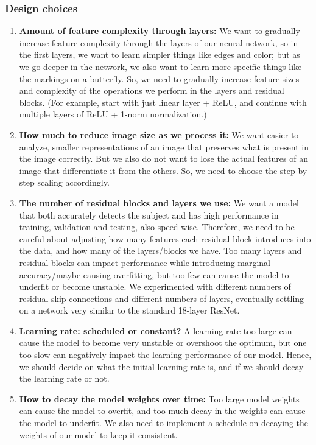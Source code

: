 \documentclass[10pt]{article} %
\begin{document}
\subsubsection{Design choices}
\begin{enumerate}
  \item \textbf{Amount of feature complexity through layers:} We want to gradually increase feature complexity through the layers of our neural network, so in the first layers, we want to learn simpler things like edges and color; but as we go deeper in the network, we also want to learn more specific things like the markings on a butterfly. So, we need to gradually increase feature sizes and complexity of the operations we perform in the layers and residual blocks. (For example, start with just linear layer + ReLU, and continue with multiple layers of ReLU + 1-norm normalization.)
  \item \textbf{How much to reduce image size as we process it:} We want easier to analyze, smaller representations of an image that preserves what is present in the image correctly. But we also do not want to lose the actual features of an image that differentiate it from the others. So, we need to choose the step by step scaling accordingly.
  \item \textbf{The number of residual blocks and layers we use:} We want a model that both accurately detects the subject and has high performance in training, validation and testing, also speed-wise. Therefore, we need to be careful about adjusting how many features each residual block introduces into the data, and how many of the layers/blocks we have. Too many layers and residual blocks can impact performance while introducing marginal accuracy/maybe causing overfitting, but too few can cause the model to underfit or become unstable. We experimented with different numbers of residual skip connections and different numbers of layers, eventually settling on a network very similar to the standard 18-layer ResNet.
  \item \textbf{Learning rate: scheduled or constant?} A learning rate too large can cause the model to become very unstable or overshoot the optimum, but one too slow can negatively impact the learning performance of our model. Hence, we should decide on what the initial learning rate is, and if we should decay the learning rate or not.
  \item \textbf{How to decay the model weights over time:} Too large model weights can cause the model to overfit, and too much decay in the weights can cause the model to underfit. We also need to implement a schedule on decaying the weights of our model to keep it consistent.

\end{enumerate}
\end{document}
